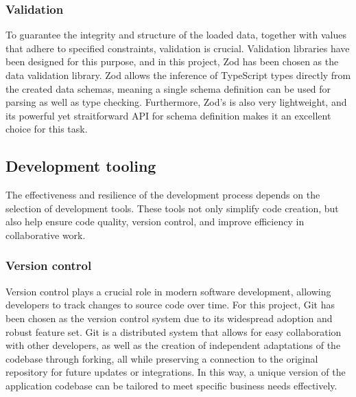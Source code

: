 \subsubsection{Validation} \label{zod}

To guarantee the integrity and structure of the loaded data, together with values that adhere to specified constraints, validation is crucial. Validation libraries have been designed for this purpose, and in this project, Zod has been chosen as the data validation library. Zod allows the inference of TypeScript types directly from the created data schemas, meaning a single schema definition can be used for parsing as well as type checking. Furthermore, Zod's is also very lightweight, and its powerful yet straitforward API for schema definition makes it an excellent choice for this task. \cite{Bhimani2023}


\subsection{Development tooling}

The effectiveness and resilience of the development process depends on the selection of development tools. These tools not only simplify code creation, but also help ensure code quality, version control, and improve efficiency in collaborative work.

\subsubsection{Version control}

Version control plays a crucial role in modern software development, allowing developers to track changes to source code over time. For this project, Git has been chosen as the version control system due to its widespread adoption and robust feature set. Git is a distributed system that allows for easy collaboration with other developers, as well as the creation of independent adaptations of the codebase through forking, all while preserving a connection to the original repository for future updates or integrations. In this way, a unique version of the application codebase can be tailored to meet specific business needs effectively.  \cite{Ponuthorai2022}

